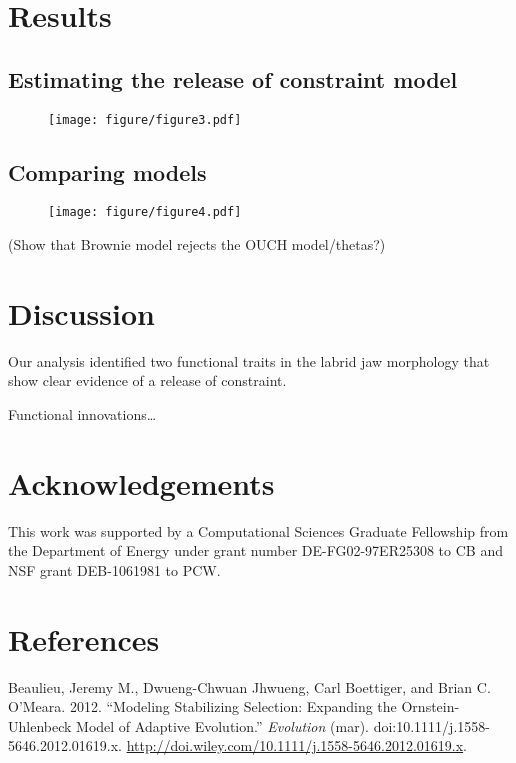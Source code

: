 \documentclass[author-year, review, 12pt]{elsarticle} %
\begin{document}
\section{Results}

\subsection{Estimating the release of constraint model}

\begin{figure}[htbp]
\centering
\texttt{[image: figure/figure3.pdf]}
\caption{}
\end{figure}

\subsection{Comparing models}

\begin{figure}[htbp]
\centering
\texttt{[image: figure/figure4.pdf]}
\caption{}
\end{figure}

(Show that Brownie model rejects the OUCH model/thetas?)

\section{Discussion}

Our analysis identified two functional traits in the labrid jaw
morphology that show clear evidence of a release of constraint.

Functional innovations\ldots{}

\section{Acknowledgements}

This work was supported by a Computational Sciences Graduate Fellowship
from the Department of Energy under grant number DE-FG02-97ER25308 to CB
and NSF grant DEB-1061981 to PCW.

\section{References}

Beaulieu, Jeremy M., Dwueng-Chwuan Jhwueng, Carl Boettiger, and Brian C.
O'Meara. 2012. ``Modeling Stabilizing Selection: Expanding the
Ornstein-Uhlenbeck Model of Adaptive Evolution.'' \emph{Evolution}
(mar). doi:10.1111/j.1558-5646.2012.01619.x.
\href{http://doi.wiley.com/10.1111/j.1558-5646.2012.01619.x}{http://doi.wiley.com/10.1111/j.1558-5646.2012.01619.x}.
\end{document}

